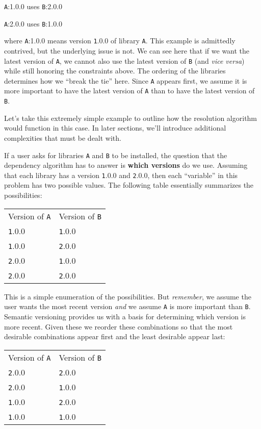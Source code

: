\documentclass[11pt,a4paper,twocolumn]{article}
\newcommand{\code}[1]{\texttt{#1}} %
\begin{document}
\begin{description}
  \item {\code A:1.0.0} uses {\code B:2.0.0}
  \item {\code A:2.0.0} uses {\code B:1.0.0}
\end{description}

where {\code A:1.0.0} means version {\code 1.0.0} of library {\code
  A}.  This example is admittedly contrived, but the underlying issue
is not.  We can see here that if we want the latest version of {\code
  A}, we cannot also use the latest version of {\code B} (and {\it
  vice versa}) while still honoring the constraints above.  The
ordering of the libraries determines how we ``break the tie'' here.
Since {\code A} appears first, we assume it is more important to have
the latest version of {\code A} than to have the latest version of
{\code B}.

Let's take this extremely simple example to outline how the resolution
algorithm would function in this case.  In later sections, we'll
introduce additional complexities that must be dealt with.

If a user asks for libraries {\code A} and {\code B} to be installed,
the question that the dependency algorithm has to answer is {\bf which
  versions} do we use.  Assuming that each library has a version
{\code 1.0.0} and {\code 2.0.0}, then each ``variable'' in this
problem has two possible values.  The following table essentially
summarizes the possibilities:

\begin{tabular}{ l l }
  Version of {\code A} & Version of {\code B} \\
  {\code 1.0.0} & {\code 1.0.0} \\
  {\code 1.0.0} & {\code 2.0.0} \\
  {\code 2.0.0} & {\code 1.0.0} \\
  {\code 2.0.0} & {\code 2.0.0} \\
\end{tabular}

This is a simple enumeration of the possibilities.  But {\em
  remember}, we assume the user wants the most recent version {\em
  and} we assume {\code A} is more important than {\code B}.  Semantic
versioning provides us with a basis for determining which version is
more recent.  Given these we reorder these combinations so that the
most desirable combinations appear first and the least desirable
appear last:

\begin{tabular}{ l l }
  Version of {\code A} & Version of {\code B} \\
  {\code 2.0.0} & {\code 2.0.0} \\
  {\code 2.0.0} & {\code 1.0.0} \\
  {\code 1.0.0} & {\code 2.0.0} \\
  {\code 1.0.0} & {\code 1.0.0} \\
\end{tabular}
\end{document}
